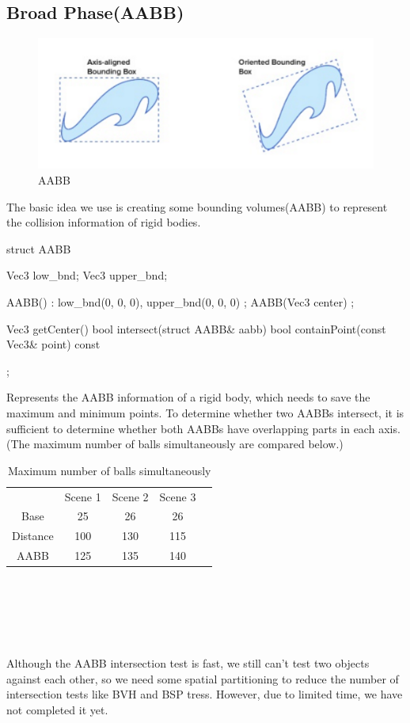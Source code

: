\documentclass[acmtog]{acmart}
\begin{document}
\subsection{Broad Phase(AABB)}
\begin{figure}[htb]
	\includegraphics[width=\linewidth]{AABB.png}
	\caption{AABB}
\end{figure}
The basic idea we use is creating some bounding volumes(AABB) to represent the collision information of rigid bodies.
\begin{cpp}
struct AABB {
	Vec3 low_bnd;
	Vec3 upper_bnd;

	AABB() : low_bnd(0, 0, 0), upper_bnd(0, 0, 0) {};
	AABB(Vec3 center) {};

	Vec3 getCenter() {}
	bool intersect(struct AABB& aabb) {}
	bool containPoint(const Vec3& point) const{}
};
\end{cpp}
Represents the AABB information of a rigid body, which needs to save the maximum and minimum points. To determine whether two AABBs intersect, it is sufficient to determine whether both AABBs have overlapping parts in each axis. (The maximum number of balls simultaneously are compared below.)
\begin{table}[htb]
	\begin{tabular}{|c|c|c|c|l}
	\cline{1-4}
			 & Scene 1 & Scene 2 & Scene 3 &  \\ \cline{1-4}
	Base     & 25      & 26      & 26      &  \\ \cline{1-4}
	Distance & 100     & 130     & 115     &  \\ \cline{1-4}
	AABB     & 125     & 135     & 140     &  \\ \cline{1-4}
	\end{tabular}
	\caption{Maximum number of balls simultaneously}
\end{table}
\\\\\\\\\\Although the AABB intersection test is fast, we still can't test two objects against each other, so we need some spatial partitioning to reduce the number of intersection tests like BVH and BSP tress. However, due to limited time, we have not completed it yet.
\end{document}
